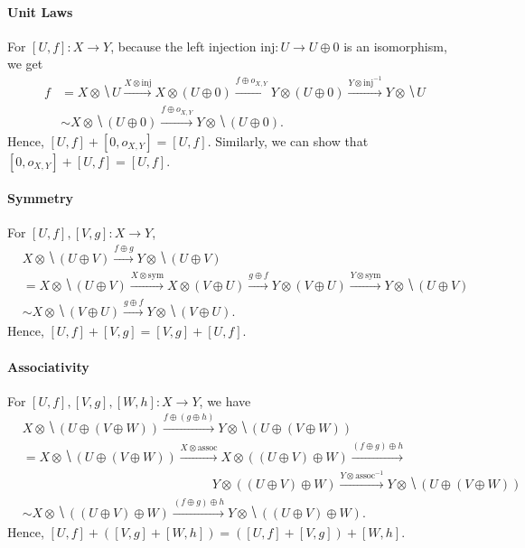 \paragraph{Unit Laws}

For $[U,f] \colon X \to Y$, because the left injection
$\mathrm{inj} \colon U \to U \oplus 0$ is an isomorphism, we get
\begin{align*}
  f &= X \otimes \hide{U} \xrightarrow{X \otimes \mathrm{inj}}
  X \otimes (U \oplus 0) \xrightarrow{f \oplus o_{X,Y}}
  Y \otimes (U \oplus 0) \xrightarrow{Y \otimes \mathrm{inj}^{-1}}
  Y \otimes \hide{U} \\
  &\sim X \otimes \hide{(U \oplus 0)}
  \xrightarrow{f \oplus o_{X,Y}}
  Y \otimes \hide{(U \oplus 0)}.
\end{align*}
Hence, $[U,f] + [0,o_{X,Y}] = [U,f]$. Similarly, we can show that
$[0,o_{X,Y}] + [U,f] = [U,f]$.

\paragraph{Symmetry}

For $[U,f],[V,g] \colon X \to Y$,
\begin{align*}
  & X \otimes \hide{(U \oplus V)} \xrightarrow{f \oplus g}
    Y \otimes \hide{(U \oplus V)} \\
  &= X \otimes \hide{(U \oplus V)} \xrightarrow{X \otimes \mathrm{sym}}
    X \otimes (V \oplus U) \xrightarrow{g \oplus f}
    Y \otimes (V \oplus U) \xrightarrow{Y \otimes \mathrm{sym}}
    Y \otimes \hide{(U \oplus V)} \\
  &\sim X \otimes \hide{(V \oplus U)} \xrightarrow{g \oplus f}
    Y \otimes \hide{(V \oplus U)}.
\end{align*}
Hence, $[U,f] + [V,g] = [V,g] + [U,f]$.

\paragraph{Associativity}

For $[U,f],[V,g],[W,h] \colon X \to Y$, we have
\begin{align*}
  & X \otimes \hide{(U \oplus (V \oplus W))}
    \xrightarrow{f \oplus (g \oplus h)}
    Y \otimes \hide{(U \oplus (V \oplus W))} \\
  &= X \otimes \hide{(U \oplus (V \oplus W))} \xrightarrow{X \otimes \mathrm{assoc}}
    X \otimes ((U \oplus V) \oplus W) \xrightarrow{(f \oplus g) \oplus h} \\
  &\hspace{15em}
    Y \otimes ((U \oplus V) \oplus W) \xrightarrow{Y \otimes \mathrm{assoc}^{-1}}
    Y \otimes \hide{(U \oplus (V \oplus W))} \\
  &\sim
    X \otimes \hide{((U \oplus V) \oplus W)} \xrightarrow{(f \oplus g) \oplus h}
    Y \otimes \hide{((U \oplus V) \oplus W)}.
\end{align*}
Hence, $[U,f] + ([V,g] + [W,h]) = ([U,f] + [V,g]) + [W,h]$.

